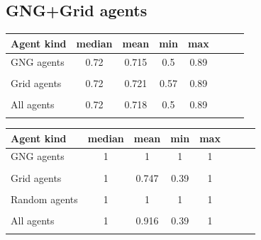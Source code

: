 \clearpage
                                       
\subsection{GNG+Grid agents}

\begin{center} 
  \begin{tabular}{l*{6}{c}r}
  Agent kind        & median & mean & min & max \\
  \hline
  GNG agents        & 0.72                  & 0.715                 & 0.5                 & 0.89  \\  
                    & \color{green}{+0.03}  & \color{green}{+0.024} & \color{red}{-0.02}  & \color{green}{+0.03} \\
  Grid agents       & 0.72                  & 0.721                 & 0.57                & 0.89  \\  
                    & \color{green}{+0.02}  & \color{green}{+0.021} & \color{green}{+0.02}& \color{red}{+0.02}   \\
  All agents        & 0.72                  & 0.718                 & 0.5                 & 0.89  \\
                    & \color{green}{+0.02}  & \color{green}{+0.020}  & \color{red}{-0.02}  & \color{green}{+0.02} 
  \end{tabular}                       
\end{center}

\begin{center} 
  \begin{tabular}{l*{6}{c}r}
  Agent kind        & median & mean & min & max \\
  \hline
  GNG agents        & 1 & 1 & 1 & 1  \\
                    &   \\
  Grid agents       & 1                     & 0.747                 & 0.39                & 1  \\  
                    & \color{green}{+0.39}  & \color{green}{0.026}  & \color{red}{-0.08}  \\
  Random agents     & 1 & 1 & 1 & 1  \\         
                    & \\
  All agents        & 1 & 0.916                 & 0.39 & 1  \\  
                    &   & \color{green}{+0.092}  & \color{red}{-0.05} \\
  \end{tabular}                                        
\end{center}

